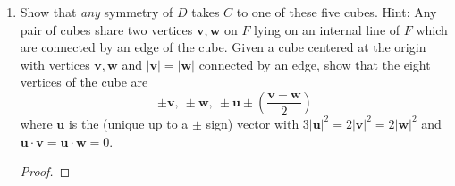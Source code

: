 \documentclass[../psets.tex]{subfiles}
\begin{document}
\begin{enumerate}
\begin{enumerate}
\begin{proof}
        \end{proof}
        \item Show that \emph{any} symmetry of $D$ takes $C$ to one of these five cubes. Hint: Any pair of cubes share two vertices $\mathbf{v},\mathbf{w}$ on $F$ lying on an internal line of $F$ which are connected by an edge of the cube. Given a cube centered at the origin with vertices $\mathbf{v},\mathbf{w}$ and $|\mathbf{v}|=|\mathbf{w}|$ connected by an edge, show that the eight vertices of the cube are
        \begin{equation*}
            \pm\mathbf{v},\ \pm\mathbf{w},\ \pm\mathbf{u}\pm\left( \frac{\mathbf{v}-\mathbf{w}}{2} \right)
        \end{equation*}
        where $\mathbf{u}$ is the (unique up to a $\pm$ sign) vector with $3|\mathbf{u}|^2=2|\mathbf{v}|^2=2|\mathbf{w}|^2$ and $\mathbf{u}\cdot\mathbf{v}=\mathbf{u}\cdot\mathbf{w}=0$.
        \begin{proof}






\end{proof}
\end{enumerate}
\end{enumerate}
\end{document}
